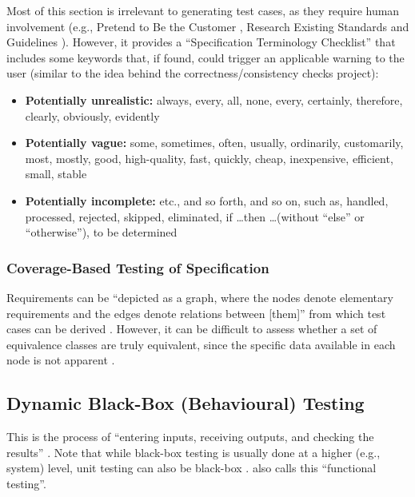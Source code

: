 Most of this section is irrelevant to generating test cases, as they require
human involvement  (e.g., Pretend to Be the Customer
\cite[p.~57-58]{patton_software_2006}, Research Existing Standards and
Guidelines \cite[p.~58-59]{patton_software_2006}). However, it provides a
``Specification Terminology Checklist'' \cite[p.~61]{patton_software_2006} that
includes some keywords that, if found, could trigger an applicable warning to
the user (similar to the idea behind the correctness/consistency checks
project):

\begin{itemize}
      \item \textbf{Potentially unrealistic:} always, every, all, none, every,
            certainly, therefore, clearly, obviously, evidently
      \item \textbf{Potentially vague:} some, sometimes, often, usually,
            ordinarily, customarily, most, mostly, good, high-quality, fast,
            quickly, cheap, inexpensive, efficient, small, stable
      \item \textbf{Potentially incomplete:} etc., and so forth, and so on,
            such as, handled, processed, rejected, skipped, eliminated,
            if \dots then \dots (without ``else'' or ``otherwise''),
            to be determined \cite[p.~408]{van_vliet_software_2000}
\end{itemize}

\subsubsection{Coverage-Based Testing of Specification
      \cite[pp.~425-426]{van_vliet_software_2000}}

Requirements can be ``depicted as a graph, where the nodes denote elementary
requirements and the edges denote relations between [them]'' from which test
cases can be derived \cite[p.~425]{van_vliet_software_2000}. However, it can
be difficult to assess whether a set of equivalence classes are truly
equivalent, since the specific data available in each node is not apparent
\cite[p.~426]{van_vliet_software_2000}.

\subsection{Dynamic Black-Box (Behavioural) Testing
      \cite[pp.~64-65]{patton_software_2006}}

This is the process of ``entering inputs, receiving outputs, and checking the
results'' \cite[p.~64]{patton_software_2006}. Note that while black-box testing
is usually done at a higher (e.g., system) level, unit testing can also be
black-box \cite[p.~1]{jacob_comparative_2016}. \cite{van_vliet_software_2000}
also calls this ``functional testing''.

